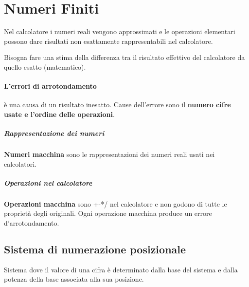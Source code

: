 \section{Numeri Finiti}
Nel calcolatore i numeri reali vengono approssimati e le operazioni elementari possono dare risultati non esattamente rappresentabili nel calcolatore.

Bisogna fare una stima della differenza tra il risultato effettivo del calcolatore da quello esatto (matematico).

\paragraph{L'errori di arrotondamento} è una causa di un risultato inesatto. Cause dell'errore sono il \textbf{numero cifre usate e l'ordine delle operazioni}.

\subparagraph{Rappresentazione dei numeri}
\textbf{Numeri macchina} sono le rappresentazioni dei numeri reali usati nei calcolatori.

\subparagraph{Operazioni nel calcolatore}
\textbf{Operazioni macchina} sono +-*/ nel calcolatore e non godono di tutte le proprietà degli originali. Ogni operazione macchina produce un errore d'arrotondamento.

\subsection{Sistema di numerazione posizionale}
Sistema dove il valore di una cifra è determinato dalla base del sistema e dalla potenza della base associata alla sua posizione.

